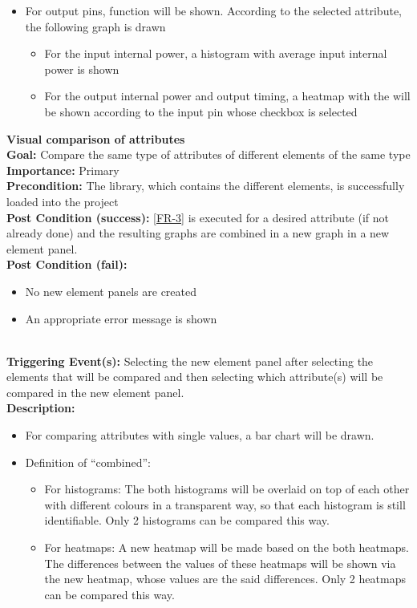 \documentclass[10pt,a4paper]{report}
\newcommand{\precondition}[1]{
    \textbf{Precondition: } #1 \leavevmode \\
}
\newcommand{\FRDescription}[8]{
    \textbf{#1} \leavevmode \\
    \textbf{Goal: } #2 \leavevmode \\
    \textbf{Importance: } #3 \leavevmode \\
    \precondition{#4}
    \textbf{Post Condition (success): } #5 \leavevmode \\
    \textbf{Post Condition (fail): } #6 \leavevmode \\
    \textbf{Triggering Event(s): } #7 \leavevmode \\
    \textbf{Description: } \leavevmode \\ 
    #8}
\begin{document}
\begin{FR}
{\begin{itemize}
\begin{itemize}
        \end{itemize}
        \item For output pins, function will be shown. According to the selected attribute, the following graph is drawn
        \begin{itemize}
            \item For the input internal power, a histogram with average input internal power is shown
            \item For the output internal power and output timing, a heatmap with the will be shown according to the input pin whose checkbox is selected
        \end{itemize}
    \end{itemize}}
    \item \FRDescription{Visual comparison of attributes}
    {Compare the same type of attributes of different elements of the same type}
    {Primary}
    {The library, which contains the different elements,  is successfully loaded into the project}
    {\ref{FR-3} is executed for a desired attribute (if not already done) and the resulting graphs are combined in a new graph in a new element panel.}
    {\begin{itemize}
        \item No new element panels are created
        \item An appropriate error message is shown
    \end{itemize}}
    {Selecting the new element panel after selecting the elements that will be compared and then selecting which attribute(s) will be compared in the new element panel.}
    {\begin{itemize}
        \item For comparing attributes with single values, a bar chart will be drawn.
        \item Definition of “combined”:
            \begin{itemize}
                \item For histograms: The both histograms will be overlaid on top of each other with different colours in a transparent way, so that each histogram is still identifiable. Only 2 histograms can be compared this way.
                \item For heatmaps: A new heatmap will be made based on the both heatmaps. The differences between the values of these heatmaps will be shown via the new heatmap, whose values are the said differences. Only 2 heatmaps can be compared this way.
            \end{itemize}

\end{itemize}}
\end{FR}
\end{document}
